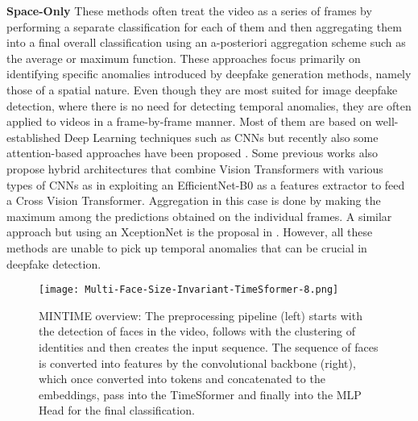 \documentclass[10pt,twocolumn,letterpaper]{article}
\begin{document}
\textbf{Space-Only}
These methods often treat the video as a series of frames by performing a separate classification for each of them and then aggregating them into a final overall classification using an a-posteriori aggregation scheme such as the average or maximum function. 
These approaches focus primarily on identifying specific anomalies introduced by deepfake generation methods, namely those of a spatial nature. Even though they are most suited for image deepfake detection, where there is no need for detecting temporal anomalies, they are often applied to videos in a frame-by-frame manner. Most of them are based on well-established Deep Learning techniques such as CNNs\cite{faceforensics, Bayar2016ADL, mesonet, 8644886} but recently also some attention-based approaches have been proposed \cite{9156378, Wang2021RepresentativeFM, multiattentional}. Some previous works also propose hybrid architectures that combine Vision Transformers with various types of CNNs as in \cite{10.1007/978-3-031-06433-3_19} exploiting an EfficientNet-B0\cite{efficientnet} as a features extractor to feed a Cross Vision Transformer\cite{crossvit}. Aggregation in this case is done by making the maximum among the predictions obtained on the individual frames. A similar approach but using an XceptionNet\cite{xception} is the proposal in \cite{10.1145/3549555.3549588}. However, all these methods are unable to pick up temporal anomalies that can be crucial in deepfake detection.

\begin{figure*}[t]
    \centering
    \texttt{[image: Multi-Face-Size-Invariant-TimeSformer-8.png]}
    \caption{MINTIME overview: The preprocessing pipeline (left) starts with the detection of faces in the video, follows with the clustering of identities and then creates the input sequence. The sequence of faces is converted into features by the convolutional backbone (right), which once converted into tokens and concatenated to the embeddings, pass into the TimeSformer and finally into the MLP Head for the final classification.}
    \label{fig:mintime}
\end{figure*}
\end{document}
